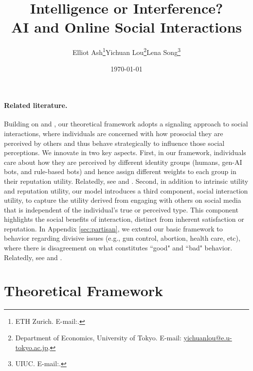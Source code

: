 \documentclass[english,12pt]{article}
\theoremstyle{plain}
\theoremstyle{plain}
\theoremstyle{definition}
\theoremstyle{definition}
\theoremstyle{assumption}
\theoremstyle{plain}
\theoremstyle{plain}
\theoremstyle{plain}
\theoremstyle{plain}
\theoremstyle{definition}%
\theoremstyle{plain}
\theoremstyle{plain}
\theoremstyle{plain}
\theoremstyle{plain}
\theoremstyle{plain}
\begin{document}
\title{Intelligence or Interference?\\ AI and Online Social Interactions}

\author{\large
\begin{tabular}{ccccccccccc}
Elliot Ash\thanks{ETH Zurich. E-mail:.} &&&&&  Yichuan Lou\thanks{Department of Economics, University of Tokyo. E-mail: \url{yichuanlou@e.u-tokyo.ac.jp}.}  &&&&& Lena Song\thanks{UIUC. E-mail:.}
\end{tabular}
}

\date{\today}

\maketitle
\thispagestyle{empty}
\begin{abstract}
\noindent


\end{abstract}



\newpage

\paragraph{Related literature.} Building on \cite{Bernheim:94} and \cite{BenabouTirole:06}, our theoretical framework adopts a signaling approach to social interactions, where individuals are concerned with how prosocial they are perceived by others and thus behave strategically to influence those social perceptions. We innovate in two key aspects. First, in our framework, individuals care about how they are perceived by different identity groups (humans, gen-AI bots, and rule-based bots) and hence assign different weights to each group in their reputation utility. Relatedly, see \cite{astensmith:05} and \cite{BursztynJensen:17}. Second, in addition to intrinsic utility and reputation utility, our model introduces a third component, social interaction utility, to capture the utility derived from engaging with others on social media that is independent of the individual's true or perceived type. This component highlights the social benefits of interaction, distinct from inherent satisfaction or reputation. In Appendix \ref{sec:partisan}, we extend our basic framework to behavior regarding divisive issues (e.g., gun control, abortion, health care, etc), where there is disagreement on what constitutes ``good" and ``bad" behavior. Relatedly, see \cite{PerezCruces:17} and \cite{Tirole:23}.


\section{Theoretical Framework}\label{sec:nonpartisan}
\end{document}
